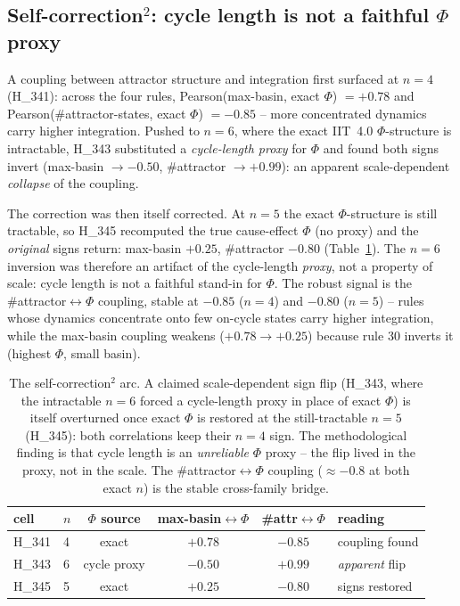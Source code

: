 \documentclass[11pt,a4paper]{article}
\begin{document}
\subsection{Self-correction\texorpdfstring{$^2$}{2}: cycle length is not a faithful \texorpdfstring{$\Phi$}{Phi} proxy}
\label{sec:self-correction}
A coupling between attractor structure and integration first surfaced at
$n=4$ (H\_341): across the four rules, Pearson(max-basin, exact $\Phi$)
$=+0.78$ and Pearson(\#attractor-states, exact $\Phi$) $=-0.85$ --
more concentrated dynamics carry higher integration. Pushed to $n=6$,
where the exact IIT~4.0 $\Phi$-structure is intractable, H\_343
substituted a \emph{cycle-length proxy} for $\Phi$ and found both signs
invert (max-basin $\to -0.50$, \#attractor $\to +0.99$): an apparent
scale-dependent \emph{collapse} of the coupling.

\noindent The correction was then itself corrected. At $n=5$ the exact
$\Phi$-structure is still tractable, so H\_345 recomputed the true
cause-effect $\Phi$ (no proxy) and the \emph{original} signs return:
max-basin $+0.25$, \#attractor $-0.80$ (Table~\ref{tab:sc2}). The $n=6$
inversion was therefore an artifact of the cycle-length \emph{proxy},
not a property of scale: cycle length is not a faithful stand-in for
$\Phi$. The robust signal is the \#attractor$\leftrightarrow\Phi$
coupling, stable at $-0.85$ ($n=4$) and $-0.80$ ($n=5$) -- rules whose
dynamics concentrate onto few on-cycle states carry higher integration,
while the max-basin coupling weakens ($+0.78 \to +0.25$) because rule 30
inverts it (highest $\Phi$, small basin).

\begin{table}[h]
\centering
\small
\begin{tabular}{llcccl}
\toprule
\textbf{cell} & \textbf{$n$} & \textbf{$\Phi$ source} &
\textbf{max-basin$\leftrightarrow\Phi$} &
\textbf{\#attr$\leftrightarrow\Phi$} & \textbf{reading} \\
\midrule
H\_341 & 4 & exact         & $+0.78$ & $-0.85$ & coupling found \\
H\_343 & 6 & cycle proxy   & $-0.50$ & $+0.99$ & \emph{apparent} flip \\
H\_345 & 5 & exact         & $+0.25$ & $-0.80$ & signs restored \\
\bottomrule
\end{tabular}
\caption{The self-correction\texorpdfstring{$^2$}{2} arc. A claimed
scale-dependent sign flip (H\_343, where the intractable $n=6$ forced a
cycle-length proxy in place of exact $\Phi$) is itself overturned once
exact $\Phi$ is restored at the still-tractable $n=5$ (H\_345): both
correlations keep their $n=4$ sign. The methodological finding is that
cycle length is an \emph{unreliable} $\Phi$ proxy -- the flip lived in
the proxy, not in the scale. The \#attractor$\leftrightarrow\Phi$
coupling ($\approx -0.8$ at both exact $n$) is the stable cross-family
bridge.}
\label{tab:sc2}
\end{table}
\end{document}
